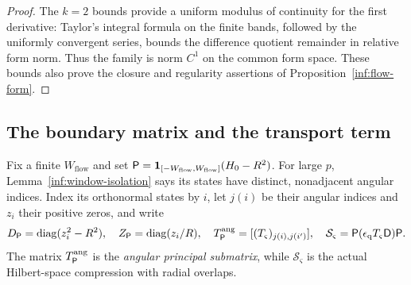 \begin{proof}
The $k=2$ bounds provide a uniform modulus of continuity for the
first derivative: Taylor's integral formula on the finite bands,
followed by the uniformly convergent series, bounds the difference
quotient remainder in relative form norm. Thus the family is norm
$C^1$ on the common form space. These bounds also prove the
closure and regularity assertions of Proposition~\ref{inf:flow-form}.
\end{proof}

\subsection{The boundary matrix and the transport term}

Fix a finite $W_{\mathrm{flow}}$ and set
$\mathsf P=\mathbf{1}_{[-W_{\mathrm{flow}},W_{\mathrm{flow}}]}(H_0-R^2)$.
For large $p$, Lemma~\ref{inf:window-isolation} says its states have
distinct, nonadjacent angular indices. Index its orthonormal states by
$i$, let $j(i)$ be their angular indices and $z_i$ their positive
zeros, and write
\[
 D_\mathsf P=\operatorname{diag}(z_i^2-R^2),\quad
 Z_\mathsf P=\operatorname{diag}(z_i/R),\quad
 T_\mathsf P^{\mathrm{ang}}=[(T_\varsigma)_{j(i),j(i')}],\quad
 \mathcal S_\varsigma=\mathsf P(\epsilon_{\mathrm q}T_\varsigma\mathsf D)\mathsf P.
\]
The matrix $T_\mathsf P^{\mathrm{ang}}$ is the \emph{angular principal
submatrix}, while $\mathcal S_\varsigma$ is the actual Hilbert-space
compression with radial overlaps.

